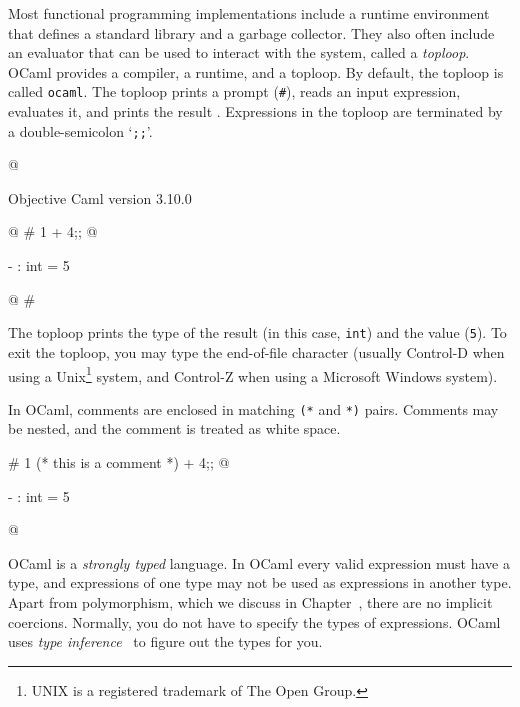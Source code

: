 
Most functional programming implementations include a
runtime environment that defines a standard library and a garbage
collector.  They also often include an evaluator that can be used to
interact with the system, called a \emph{toploop}.  OCaml provides a compiler, a runtime, and a
toploop.  By default, the toploop is called \lstinline/ocaml/.  The toploop
prints a prompt (\hbox{\lstinline/#/}), reads an input expression, evaluates it,
and prints the result .  Expressions in the toploop are terminated by
a double-semicolon `\hbox{\lstinline/;;/}'.

\label{keyword:;;}

\begin{ocaml}
@
\begin{topoutput}
        Objective Caml version 3.10.0
\end{topoutput}
@
# 1 + 4;;
@
\begin{topoutput}
- : int = 5
\end{topoutput}
@
#
\end{ocaml}
%
The toploop prints the type of the result (in this case,
\hbox{\lstinline/int/}) and the value (\hbox{\lstinline/5/}).  To exit
the toploop, you may type the end-of-file character (usually Control-D
when using a Unix\footnote{UNIX is a registered trademark of The Open
  Group.} system, and Control-Z when using a Microsoft Windows system).


In OCaml, comments are enclosed in matching \verb+(*+ and \verb+*)+
pairs.  Comments may be nested, and the comment is treated
as white space.

\begin{ocaml}
# 1 (* this is a comment *) + 4;;
@
\begin{topoutput}
- : int = 5
\end{topoutput}
@
\end{ocaml}


OCaml is a \emph{strongly typed} language.  In OCaml every valid
expression must have a type, and expressions of one type may not be
used as expressions in another type.  Apart from polymorphism, which
we discuss in Chapter~, there are no implicit
coercions.  Normally, you do not have to specify the types of
expressions.  OCaml uses \emph{type inference}~\cite{DM82} to figure
out the types for you.

